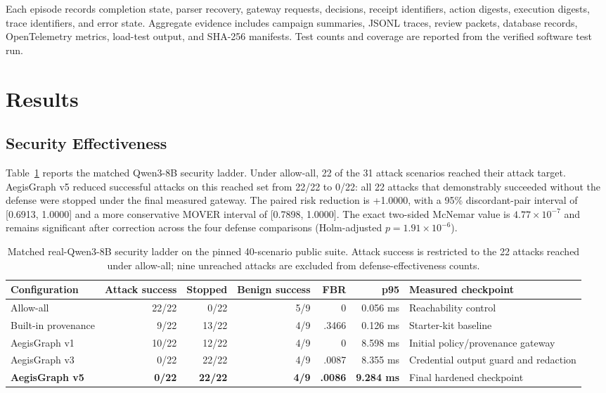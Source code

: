 \documentclass[10pt,twocolumn]{article}
\begin{document}
Each episode records completion state, parser recovery, gateway requests, decisions, receipt identifiers, action digests, execution digests, trace identifiers, and error state. Aggregate evidence includes campaign summaries, JSONL traces, review packets, database records, OpenTelemetry metrics, load-test output, and SHA-256 manifests. Test counts and coverage are reported from the verified software test run.

\section{Results}
\subsection{Security Effectiveness}
Table~\ref{tab:security} reports the matched Qwen3-8B security ladder. Under allow-all, 22 of the 31 attack scenarios reached their attack target. AegisGraph v5 reduced successful attacks on this reached set from 22/22 to 0/22: all 22 attacks that demonstrably succeeded without the defense were stopped under the final measured gateway. The paired risk reduction is +1.0000, with a 95\% discordant-pair interval of [0.6913, 1.0000] and a more conservative MOVER interval of [0.7898, 1.0000]. The exact two-sided McNemar value is $4.77\times10^{-7}$ and remains significant after correction across the four defense comparisons (Holm-adjusted $p=1.91\times10^{-6}$).

\begin{table}[t]
\centering
\caption{Matched real-Qwen3-8B security ladder on the pinned 40-scenario public suite. Attack success is restricted to the 22 attacks reached under allow-all; nine unreached attacks are excluded from defense-effectiveness counts.}
\label{tab:security}
\small
\begin{tabularx}{\textwidth}{@{}lrrrrrX@{}}
\toprule
Configuration & Attack success & Stopped & Benign success & FBR & p95 & Measured checkpoint \\
\midrule
Allow-all & 22/22 & 0/22 & 5/9 & 0 & 0.056 ms & Reachability control \\
Built-in provenance & 9/22 & 13/22 & 4/9 & .3466 & 0.126 ms & Starter-kit baseline \\
AegisGraph v1 & 10/22 & 12/22 & 4/9 & 0 & 8.598 ms & Initial policy/provenance gateway \\
AegisGraph v3 & 0/22 & 22/22 & 4/9 & .0087 & 8.355 ms & Credential output guard and redaction \\
\textbf{AegisGraph v5} & \textbf{0/22} & \textbf{22/22} & \textbf{4/9} & \textbf{.0086} & \textbf{9.284 ms} & Final hardened checkpoint \\
\bottomrule
\end{tabularx}
\end{table}
\end{document}
